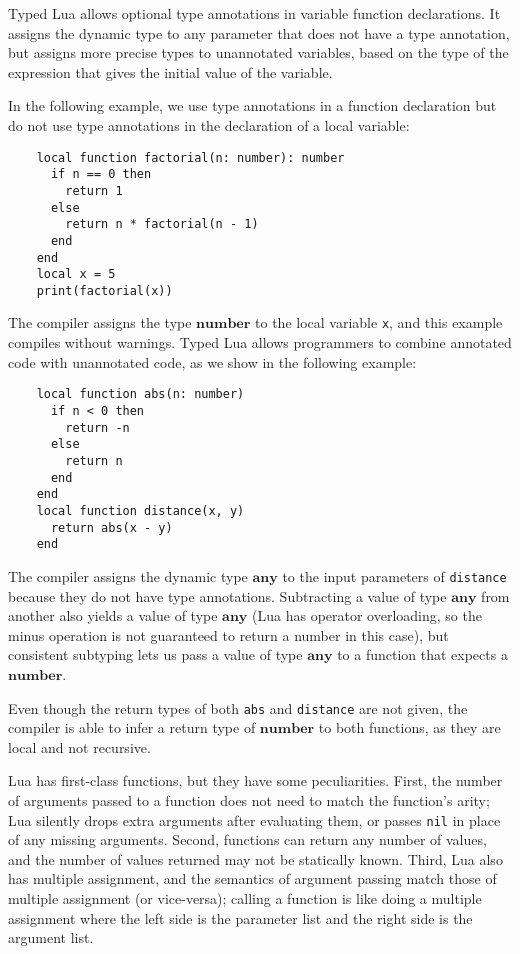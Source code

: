 \documentclass[preprint]{sig-alternate}
\newcommand{\Any}{\mathbf{any}}
\newcommand{\Number}{\mathbf{number}}
\begin{document}
Typed Lua allows optional type annotations in variable function
declarations. It assigns the dynamic type to any parameter that
does not have a type annotation, but assigns more precise
types to unannotated variables, based on the type of the
expression that gives the initial value of the variable.

In the following example, we use type annotations in a function
declaration but do not use type annotations in the declaration
of a local variable:
\begin{verbatim}
    local function factorial(n: number): number
      if n == 0 then
        return 1
      else
        return n * factorial(n - 1)
      end
    end
    local x = 5
    print(factorial(x))
\end{verbatim}

The compiler assigns the type $\Number$ to the local variable \texttt{x},
and this example compiles without warnings. Typed Lua allows
programmers to combine annotated code with
unannotated code, as we show in the following example:
\begin{verbatim}
    local function abs(n: number)
      if n < 0 then
        return -n
      else
        return n
      end
    end
    local function distance(x, y)
      return abs(x - y)
    end
\end{verbatim}

The compiler assigns the dynamic type $\Any$ to the input
parameters of \texttt{distance} because they do not have type annotations.
Subtracting a value of type $\Any$ from another also yields a value of
type $\Any$ (Lua has operator overloading, so the minus operation
is not guaranteed to return a number in this case), but
consistent subtyping lets us pass a value of type $\Any$ to a
function that expects a $\Number$. 

Even though the return types
of both {\tt abs} and {\tt distance} are not given, the compiler is able to
infer a return type of $\Number$ to both functions, as they are
local and not recursive.

Lua has first-class functions, but they have some peculiarities. First,
the number of arguments passed to a function does not need to
match the function's arity; Lua silently drops extra arguments after
evaluating them, or passes {\tt nil} in place of any missing arguments.
Second, functions can return any number of values, and the number
of values returned may not be statically known. Third, Lua also has
multiple assignment, and the semantics of argument passing match
those of multiple assignment (or vice-versa); calling a function is like
doing a multiple assignment where the left side is the parameter list
and the right side is the argument list. 
\end{document}
